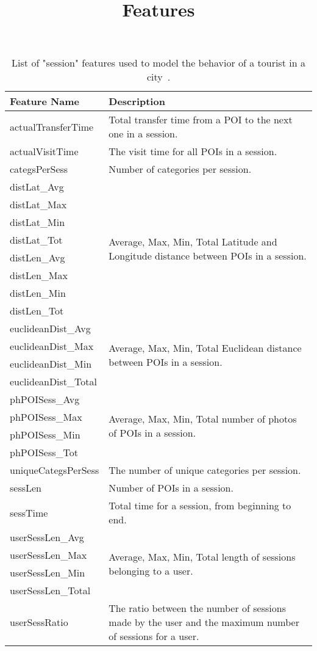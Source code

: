 \documentclass[9pt]{extarticle}
\title{Features}
\author{}
\date{}
\begin{document}
\maketitle

\begin{table}[ht]
\caption{List of "session" features used to model the behavior of a tourist in a city~\cite{baraglia2013learnext}.}
\centering
\begin{tabular}{l|m{}} \hline
\textbf{Feature Name} & \textbf{Description} \\ \hline
actualTransferTime & Total transfer time from a POI to the next one in a session. \\ \hline
actualVisitTime    & The visit time for all POIs in a session. \\ \hline
categsPerSess      & Number of categories per session. \\ \hline
distLat\_Avg       & \multirow{8}{*}{Average, Max, Min, Total Latitude and Longitude distance between POIs in a session.} \\
distLat\_Max       & \\
distLat\_Min       & \\
distLat\_Tot       & \\
distLen\_Avg       & \\
distLen\_Max       & \\
distLen\_Min       & \\
distLen\_Tot       & \\ \hline
euclideanDist\_Avg & \multirow{4}{*}{Average, Max, Min, Total Euclidean distance between POIs in a session.} \\
euclideanDist\_Max & \\
euclideanDist\_Min & \\
euclideanDist\_Total & \\ \hline
phPOISess\_Avg     & \multirow{4}{*}{Average, Max, Min, Total number of photos of POIs in a session.} \\
phPOISess\_Max     & \\
phPOISess\_Min     & \\
phPOISess\_Tot     & \\ \hline
uniqueCategsPerSess & The number of unique categories per session. \\ \hline
sessLen            & Number of POIs in a session. \\ \hline
sessTime           & Total time for a session, from beginning to end. \\ \hline
userSessLen\_Avg   & \multirow{4}{*}{Average, Max, Min, Total length of sessions belonging to a user.} \\
userSessLen\_Max   & \\
userSessLen\_Min   & \\
userSessLen\_Total & \\ \hline
userSessRatio      & The ratio between the number of sessions made by the user and the maximum number of sessions for a user.\\ \hline
\end{tabular}
\end{table}
\end{document}
